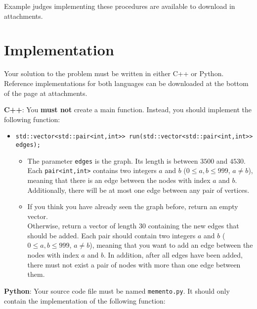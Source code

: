 Example judges implementing these procedures are available to download in attachments.

\section*{Implementation}
Your solution to the problem must be written in either C++ or Python. Reference implementations
for both languages can be downloaded at the bottom of the page at attachments.

\textbf{C++}:
You \textbf{must not} create a main function. Instead, you should implement the following function:\\

\begin{itemize}
  \item \verb|std::vector<std::pair<int,int>> run(std::vector<std::pair<int,int>> edges);| \\
  \begin{itemize}
    \item The parameter \texttt{edges} is the graph. Its length is between $3500$ and $4530$.
    Each \verb|pair<int,int>| contains two integers $a$ and $b$ ($0 \leq a,b \leq 999$, $a \neq b$),
    meaning that there is an edge between the nodes with index $a$ and $b$. Additionally,
    there will be at most one edge between any pair of vertices.
    \item If you think you have already seen the graph before, return an empty vector.\\
    Otherwise, return a vector of length 30 containing the new edges that should be added.
    Each pair should contain two integers $a$ and $b$ ($0 \leq a,b \leq 999$, $a \neq b$),
    meaning that you want to add an edge between the nodes with index $a$ and $b$.
    In addition, after all edges have been added, there must not exist a pair of nodes with more than one edge between them.
  \end{itemize}
\end{itemize}


\textbf{Python}:
Your source code file must be named \texttt{memento.py}. It should only contain the implementation of the following function:\\

